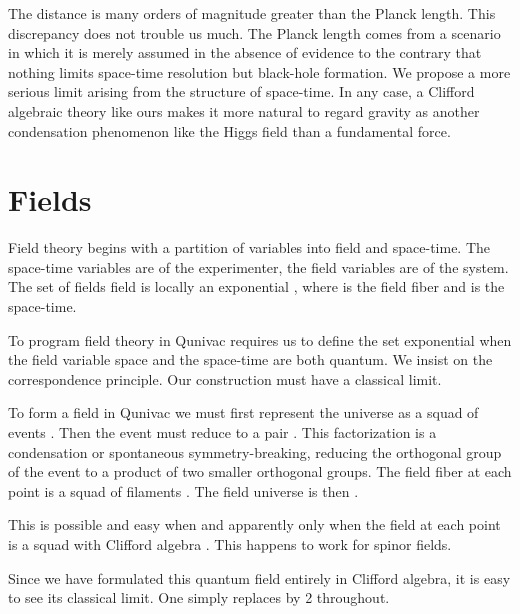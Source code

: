 \documentclass[a4paper,11pt]{article}
\begin{document}
The distance  \coordHE{} is many orders of magnitude 
greater than the Planck length.
This discrepancy does not trouble us much.
The Planck length
comes from a scenario
in which it is merely assumed 
in the absence of evidence to the contrary
that nothing limits space-time resolution
but black-hole formation.
We propose a more serious limit
arising from the structure of space-time.
In any case,
a Clifford algebraic theory like ours makes it more natural
to regard gravity as another condensation phenomenon
like the Higgs field
than a fundamental force.


\section{Fields}

Field theory begins with a partition
of variables into field and space-time.
The space-time variables are of the experimenter,
the field variables are of the system.
The set of fields field is locally an exponential \coordHE{},
where \coordHE{} is the field fiber and \coordHE{} is the space-time.

To program  field theory in Qunivac
requires us to define the set exponential
\coordHE{} when the field variable space \coordHE{} and the space-time \coordHE{}
are both quantum.
We insist on the correspondence principle.
Our construction must have a classical limit.

To form a field in Qunivac we must first represent
the universe as a squad of events \coordHE{}.
Then the event must reduce to a pair \coordHE{}.
This factorization is a condensation or spontaneous symmetry-breaking,
reducing the orthogonal group of the event \coordHE{}
 to a product of two smaller orthogonal groups.
The field fiber at each point is a squad of filaments \coordHE{}.
The field universe is then \coordHE{}.

This is possible and easy when and apparently only when the 
field   \coordHE{} at each point  is a squad with Clifford algebra \coordHE{}.
This happens to work for spinor fields.

Since we have formulated this quantum field entirely
in Clifford algebra,
it is easy to see its classical limit.
One simply replaces \coordHE{} by 2 throughout.
\end{document}
